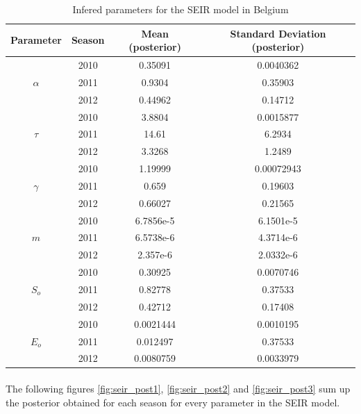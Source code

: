 \documentclass[11pt, a4paper]{article}
\begin{document}
\begin{table}[H]
\FloatBarrier
\centering
\begin{tabular}{| c | c | c | c |}
    \hline
    Parameter & Season & Mean (posterior) &  Standard Deviation (posterior)\\ \hline
    \multirow{3}{*}{$\alpha$} & 2010 & 0.35091 & 0.0040362\\
    & 2011 & 0.9304 & 0.35903\\
    & 2012 & 0.44962 & 0.14712 \\ \hline
    \multirow{3}{*}{$\tau$} & 2010 & 3.8804 & 0.0015877 \\ 
    & 2011 & 14.61 & 6.2934 \\
    & 2012 & 3.3268 & 1.2489\\ \hline
    \multirow{3}{*}{$\gamma$} & 2010 & 1.19999 & 0.00072943\\
    & 2011 & 0.659 & 0.19603 \\ 
    & 2012 & 0.66027 & 0.21565 \\ \hline
    \multirow{3}{*}{$m$} & 2010 & 6.7856e-5 & 6.1501e-5 \\ 
    & 2011 & 6.5738e-6 & 4.3714e-6 \\
    & 2012 & 2.357e-6 & 2.0332e-6 \\ \hline
    \multirow{3}{*}{$S_o$} & 2010 & 0.30925 & 0.0070746 \\ 
    & 2011 & 0.82778 & 0.37533 \\ 
    & 2012 & 0.42712 & 0.17408 \\ \hline
    \multirow{3}{*}{$E_o$} & 2010 & 0.0021444 & 0.0010195\\
    & 2011 & 0.012497 & 0.37533 \\ 
    & 2012 & 0.0080759 & 0.0033979 \\ \hline
    \end{tabular}
    \caption{Infered parameters for the SEIR model in Belgium}
    \label{tab:seirDRAM}
\end{table}

\paragraph{}
The following figures \ref{fig:seir_post1}, \ref{fig:seir_post2} and \ref{fig:seir_post3} sum up the posterior obtained for each season for every parameter in the SEIR model.
\end{document}
